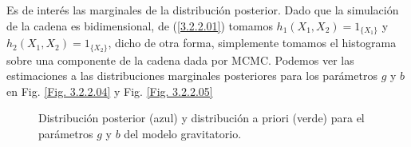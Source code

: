 Es de interés las marginales de la distribución posterior. Dado que la simulación de la cadena es bidimensional, de (\ref{3.2.2.01}) tomamos $h_1(X_1,X_2) = 1_{\{X_1\}}$ y $h_2(X_1,X_2)= 1_{\{X_2\}}$, dicho de otra forma, simplemente tomamos el histograma sobre una componente de la cadena dada por MCMC. Podemos ver las estimaciones a las distribuciones marginales posteriores para los parámetros $g$ y $b$ en  Fig. \ref{Fig. 3.2.2.04} y Fig. \ref{Fig. 3.2.2.05}

\begin{figure}[h]
    \centering
    \qquad
    \caption{Distribución posterior (azul) y distribución a priori (verde) para el parámetros $g$ y $b$ del modelo gravitatorio. }
    \label{Fig. 3.2.gravedad.theta}
\end{figure}



